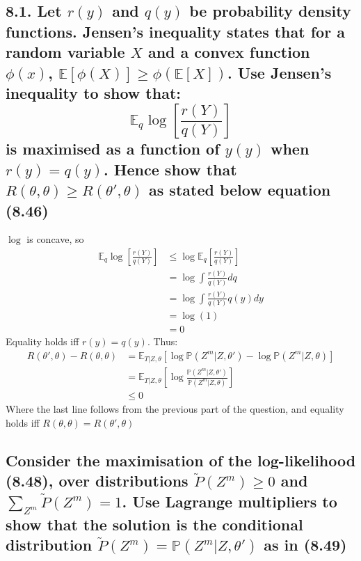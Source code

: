 \subsection*{8.1. Let $r(y)$ and $q(y)$ be probability density functions. Jensen's inequality states that for a random variable $X$ and a convex function $\phi(x)$, $\mathbb{E}\left[\phi(X)\right] \geq \phi\left(\mathbb{E}\left[ X \right] \right)$.
Use Jensen's inequality to show that:
$$\mathbb{E}_q \log \left[ \frac{r(Y)}{q(Y)}\right] $$ 
is maximised as a function of $y(y)$ when $r(y) = q(y)$. Hence show that $R(\theta, \theta) \geq R(\theta', \theta)$ as stated below equation (8.46)
}

$\log$ is concave, so
\begin{align*}
    \mathbb{E}_q \log \left[ \frac{r(Y)}{q(Y)}\right] &\leq \log \mathbb{E}_q \left[\frac{r(Y)}{q(Y)}\right] \\ 
    &= \log \int \frac{r(Y)}{q(Y)} dq \\ 
    &= \log \int \frac{r(Y) }{q(Y)} q(y) dy \\
    &= \log(1) \\
    &= 0
\end{align*}
Equality holds iff $r(y) = q(y)$. Thus:
\begin{align*}
    R(\theta', \theta) - R(\theta, \theta) &= \mathbb{E}_{T|Z, \theta}\left[\log \mathbb{P}\left(Z^m|Z, \theta'\right) - \log \mathbb{P}\left(Z^m|Z, \theta\right)\right] \\
    &= \mathbb{E}_{T|Z, \theta}\left[\log \frac{\mathbb{P}\left(Z^m|Z, \theta'\right)}{ \mathbb{P}\left(Z^m|Z, \theta \right)}\right] \\
    &\leq 0
\end{align*}
Where the last line follows from the previous part of the question, and equality holds iff $R(\theta, \theta) = R(\theta', \theta)$

\subsection*{Consider the maximisation of the log-likelihood (8.48), over distributions $\tilde{P}(Z^m) \geq 0$ and $\sum_{Z^m} \tilde{P}(Z^m) = 1$. Use Lagrange multipliers to show that the solution is the conditional distribution $\tilde{P}(Z^m) =\mathbb{P}(Z^m \vert Z, \theta')$ as in (8.49)}

